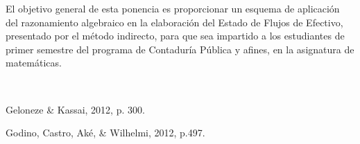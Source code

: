 \begin{titlepage}
\begin{minipage}{0.85\linewidth}
\begin{minipage}{0.85\linewidth}
\begin{resumen}
El objetivo general de esta ponencia es proporcionar un esquema de aplicaci\'on del razonamiento algebraico en la elaboraci\'on del Estado de Flujos de Efectivo, presentado por el m\'etodo indirecto, para que sea impartido a los estudiantes de primer semestre del programa de Contadur\'ia P\'ublica y afines, en la asignatura de matem\'aticas. 
    \end{resumen}
\end{minipage}
\vspace*{5pt}\\
\footnotesize
%  
    
\end{minipage}
\vspace{5pt}
\begin{thebibliography}{99}
 Geloneze \& Kassai, 2012,  p. 300.

  Godino, Castro, Ak\'e, \& Wilhelmi, 2012, p.497. 

\end{thebibliography}
\end{titlepage}
